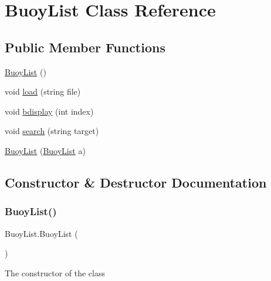 \hypertarget{class_buoy_list}{}\section{Buoy\+List Class Reference}
\label{class_buoy_list}
\subsection*{Public Member Functions}
\begin{DoxyCompactItemize}
\item 
\mbox{\hyperlink{class_buoy_list_a39b03994875a552bdb1087caa2d6b431}{Buoy\+List}} ()
\item 
void \mbox{\hyperlink{class_buoy_list_a5e6195c4558add60568a3fcc12888662}{load}} (string file)
\item 
void \mbox{\hyperlink{class_buoy_list_ac25d70b5e55ad4ce113a1fc26c14b2f0}{bdisplay}} (int index)
\item 
void \mbox{\hyperlink{class_buoy_list_a8e7b3aae97170c455e436a6924947e9b}{search}} (string target)
\item 
\mbox{\hyperlink{class_buoy_list_afedfe1b7d724da215430042550790747}{Buoy\+List}} (\mbox{\hyperlink{class_buoy_list}{Buoy\+List}} a)
\end{DoxyCompactItemize}


\subsection{Constructor \& Destructor Documentation}
\mbox{\label{class_buoy_list_a39b03994875a552bdb1087caa2d6b431}} 
\subsubsection{\texorpdfstring{Buoy\+List()}{BuoyList()}\hspace{0.1cm}{\footnotesize\ttfamily [1/2]}}
{\footnotesize\ttfamily Buoy\+List.\+Buoy\+List (\begin{DoxyParamCaption}{ }\end{DoxyParamCaption})\hspace{0.3cm}{\ttfamily [inline]}}

The constructor of the class \mbox{\label{class_buoy_list_afedfe1b7d724da215430042550790747}} 
